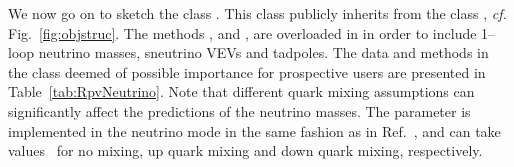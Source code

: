 \documentclass[pdflatex,final,3p,times]{elsarticle}
\begin{document}
We now go on to sketch the class .  This class
publicly inherits from the class , \textit{cf.} Fig.~\ref{fig:objstruc}. 
The  methods ,   
and  ,   are overloaded  in  in order to 
include 1--loop neutrino masses, sneutrino VEVs and tadpoles.
The data and methods in the
 class deemed of possible importance for prospective
users are presented in Table~\ref{tab:RpvNeutrino}.
Note that different quark mixing 
assumptions can significantly 
affect the predictions of the neutrino masses. The  parameter is
implemented   in the neutrino mode in the same fashion as in
Ref.~\cite{Allanach:2001kg}, and can take values ~for no mixing,
up quark mixing and down quark mixing, respectively.
\end{document}
